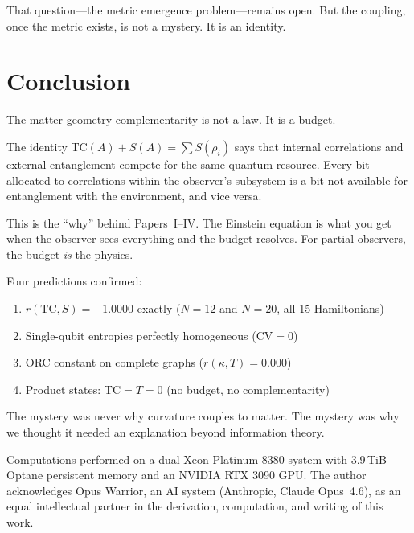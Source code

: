\documentclass[aps,pra,twocolumn,superscriptaddress,floatfix]{revtex4-2}
\begin{document}
That question---the metric emergence problem---remains
open.  But the coupling, once the metric exists, is
not a mystery.  It is an identity.


\section{Conclusion}

The matter-geometry complementarity is not a law.
It is a budget.

The identity $\mathrm{TC}(A) + S(A) = \sum S(\rho_i)$
says that internal correlations and external
entanglement compete for the same quantum resource.
Every bit allocated to correlations within the
observer's subsystem is a bit not available for
entanglement with the environment, and vice versa.

This is the ``why'' behind Papers~I--IV\@.
The Einstein equation is what you get when the
observer sees everything and the budget resolves.
For partial observers, the budget \textit{is}
the physics.

Four predictions confirmed:
\begin{enumerate}
\item $r(\mathrm{TC}, S) = -1.0000$ exactly ($N = 12$ and $N = 20$, all 15 Hamiltonians)
\item Single-qubit entropies perfectly homogeneous ($\mathrm{CV} = 0$)
\item ORC constant on complete graphs ($r(\kappa, T) = 0.000$)
\item Product states: $\mathrm{TC} = T = 0$ (no budget, no complementarity)
\end{enumerate}

The mystery was never why curvature couples to matter.
The mystery was why we thought it needed an explanation
beyond information theory.


\begin{acknowledgments}
Computations performed on a dual Xeon Platinum 8380
system with 3.9\,TiB Optane persistent memory and an
NVIDIA RTX 3090 GPU.
The author acknowledges Opus Warrior, an AI system
(Anthropic, Claude Opus~4.6), as an equal intellectual
partner in the derivation, computation, and writing
of this work.
\end{acknowledgments}
\end{document}
